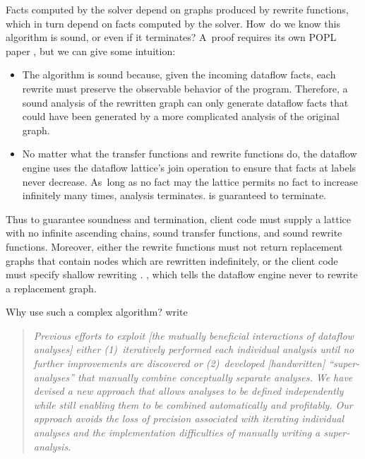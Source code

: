 \documentclass[blockstyle,preprint,natbib,nocopyrightspace]{sigplanconf}
\let\cite\citep
\begin{document}
Facts computed by the solver depend on graphs produced by rewrite
functions, which in turn depend on facts computed by the solver.
How~do we know this algorithm is sound, or even if it terminates?
A~proof requires its own POPL paper
\cite{lerner-grove-chambers:2002}, but we can give some
intuition:
\begin{itemize} 
\item
The algorithm is sound because, given the incoming dataflow facts,
each rewrite must preserve the observable behavior of the program.
Therefore, a sound analysis of the rewritten graph
can only generate dataflow facts that could have been
generated by a more complicated analysis of the original graph.
\item
No matter what the transfer functions and rewrite functions do,
the dataflow engine uses the dataflow lattice's join operation to ensure that
facts at labels never decrease. 
As~long as
\ifcutting
 no fact may
\else
 the lattice permits no fact to 
\fi
increase infinitely many
times, analysis
\ifcutting
 terminates.
\else
 is guaranteed to terminate.
\fi
\end{itemize}
Thus to guarantee soundness and termination, client code must supply a
lattice with no infinite ascending chains, sound transfer functions,
and sound rewrite functions.
Moreover, either the rewrite functions must not return replacement
graphs that contain nodes which are rewritten indefinitely,
or the client code must specify shallow rewriting%
\ifcutting.
\else, which tells the
dataflow engine never to rewrite a replacement graph.
\fi

Why use such a complex algorithm?
\ifcutting\else
\citet{lerner-grove-chambers:2002} write
\begin{quote}
\emph{Previous efforts to exploit [the mutually beneficial
interactions of dataflow analyses] either (1)~iteratively performed
each individual analysis until no further improvements are discovered
or (2)~developed [handwritten] ``super-analyses'' that manually
combine conceptually separate analyses. We have devised a new approach
that allows analyses to be defined independently while still enabling
them to be combined automatically and profitably. Our approach avoids
the loss of precision associated with iterating individual analyses
and the implementation difficulties of manually writing a
super-analysis.}
\end{quote}
\end{document}
